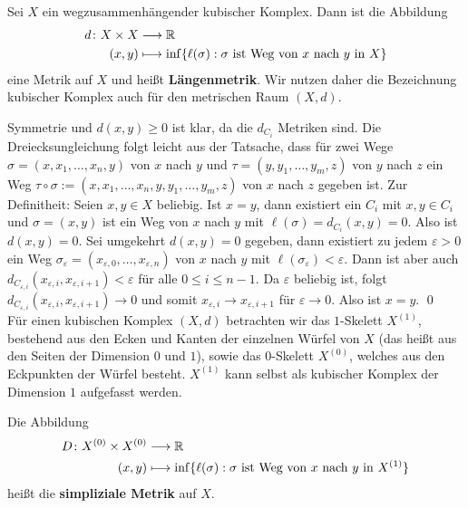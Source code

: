\begin{lemma}[Längenmetrik]
	Sei $X$ ein wegzusammenhängender kubischer Komplex. Dann ist die Abbildung
	\begin{equation}
	\begin{aligned}
		d \colon X \times X &\longrightarrow \mathbb{R} \\
		(x,y) &\longmapsto \inf\{ \ell(\sigma) : \sigma \text{ ist Weg von } x \text{ nach } y \text{ in } X\}
	\end{aligned}
	\end{equation}
	eine Metrik auf $X$ und heißt \textbf{Längenmetrik}. Wir nutzen daher die Bezeichnung kubischer Komplex auch für den metrischen Raum $(X,d)$.  
\end{lemma}

	Symmetrie und $d(x,y) \geq 0$ ist klar, da die $d_{C_i}$ Metriken sind. Die Dreiecksungleichung folgt leicht aus der Tatsache, dass für zwei Wege $\sigma = (x, x_1, \dots, x_n, y)$ von $x$ nach $y$ und $\tau = (y, y_1, \dots, y_m, z)$ von $y$ nach $z$ ein Weg $\tau \circ \sigma := (x, x_1, \dots, x_n, y, y_1, \dots, y_m, z)$ von $x$ nach $z$ gegeben ist. Zur Definitheit:  Seien $x,y \in X$ beliebig. Ist $x = y$, dann existiert ein $C_i$ mit $x,y \in C_i$ und $\sigma = (x,y)$ ist ein Weg von $x$ nach $y$ mit $\ell(\sigma) = d_{C_i}(x,y) = 0$. Also ist $d(x,y) = 0$. Sei umgekehrt $d(x,y) = 0$ gegeben, dann existiert zu jedem $\varepsilon > 0$ ein Weg $\sigma_\varepsilon = (x_{\varepsilon,0}, \dots, x_{\varepsilon,n})$ von $x$ nach $y$ mit $\ell(\sigma_\varepsilon) < \varepsilon$. Dann ist aber auch $d_{C_{\varepsilon,i}}(x_{\varepsilon,i},x_{\varepsilon,i+1}) < \varepsilon$ für alle $0 \leq i \leq n-1$. Da $\varepsilon$ beliebig ist, folgt $d_{C_{\varepsilon,i}}(x_{\varepsilon,i},x_{\varepsilon,i+1}) \rightarrow 0$ und somit $x_{\varepsilon,i} \rightarrow x_{\varepsilon,i+1}$ für $\varepsilon \rightarrow 0$. Also ist $x = y$. \qed \\

Für einen kubischen Komplex $(X,d)$ betrachten wir das $1$-Skelett $X^{(1)}$, bestehend aus den Ecken und Kanten der einzelnen Würfel von $X$ (das heißt aus den Seiten der Dimension $0$ und $1$), sowie das $0$-Skelett $X^{(0)}$, welches aus den Eckpunkten der Würfel besteht. $X^{(1)}$ kann selbst als kubischer Komplex der Dimension $1$ aufgefasst werden.

\begin{defn}
\label{def_D}
	Die Abbildung
	\begin{equation}
	\begin{aligned}
		D\colon  X^{(0)} \times X^{(0)} &\longrightarrow \mathbb{R} \\
		(x,y) &\longmapsto \inf \{ \ell(\sigma) : \sigma \text{ ist Weg von } x \text{ nach } y \text{ in } X^{(1)}\}
	\end{aligned}
	\end{equation}
	heißt die \textbf{simpliziale Metrik} auf $X$.
\end{defn}

